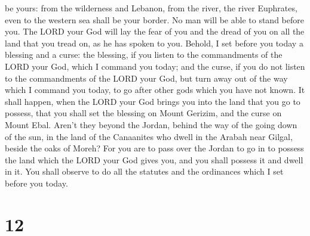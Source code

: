 be yours: from the wilderness and Lebanon, from the river, the river
Euphrates, even to the western sea shall be your border. 
No man will be able to stand before you. The LORD your God will lay the
fear of you and the dread of you on all the land that you tread on, as
he has spoken to you.  Behold, I set before you today a
blessing and a curse:  the blessing, if you listen to the
commandments of the LORD your God, which I command you today;
 and the curse, if you do not listen to the commandments
of the LORD your God, but turn away out of the way which I command you
today, to go after other gods which you have not known. 
It shall happen, when the LORD your God brings you into the land that
you go to possess, that you shall set the blessing on Mount Gerizim, and
the curse on Mount Ebal.  Aren't they beyond the Jordan,
behind the way of the going down of the sun, in the land of the
Canaanites who dwell in the Arabah near Gilgal, beside the oaks of
Moreh?  For you are to pass over the Jordan to go in to
possess the land which the LORD your God gives you, and you shall
possess it and dwell in it.  You shall observe to do all
the statutes and the ordinances which I set before you today.

\hypertarget{section-11}{%
\section{12}\label{section-11}}

